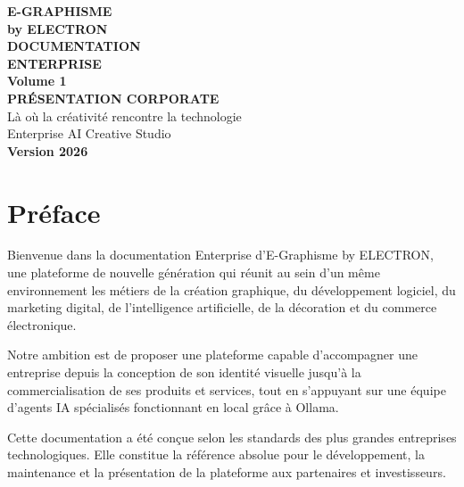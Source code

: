 \documentclass[12pt,a4paper,oneside]{book}
\begin{document}
\begin{titlepage}
\thispagestyle{empty}
\begin{center}
\vspace*{2cm}
{\Huge\bfseries\color{electronblue}E-GRAPHISME}\\[0.3cm]
{\LARGE\bfseries\color{electronpurple}by ELECTRON}\\[2cm]
\vspace{2cm}
{\huge\bfseries\color{darkbg}DOCUMENTATION}\\[0.3cm]
{\huge\bfseries\color{darkbg}ENTERPRISE}\\[1cm]
{\Large\bfseries\color{electroncyan}Volume 1}\\[0.5cm]
{\Large\bfseries\color{darkbg}PRÉSENTATION CORPORATE}\\[3cm]
\vspace{2cm}
{\Large\color{mediumgray}Là où la créativité rencontre la technologie}\\[1cm]
{\Large\color{electronpurple}Enterprise AI Creative Studio}\\[2cm]
{\Large\bfseries\color{electrongold}Version 2026}\\[2cm]
\vfill
\end{center}
\end{titlepage}

\frontmatter

\chapter*{Préface}

Bienvenue dans la documentation Enterprise d'E-Graphisme by ELECTRON, une plateforme de nouvelle génération qui réunit au sein d'un même environnement les métiers de la création graphique, du développement logiciel, du marketing digital, de l'intelligence artificielle, de la décoration et du commerce électronique.

Notre ambition est de proposer une plateforme capable d'accompagner une entreprise depuis la conception de son identité visuelle jusqu'à la commercialisation de ses produits et services, tout en s'appuyant sur une équipe d'agents IA spécialisés fonctionnant en local grâce à Ollama.

Cette documentation a été conçue selon les standards des plus grandes entreprises technologiques. Elle constitue la référence absolue pour le développement, la maintenance et la présentation de la plateforme aux partenaires et investisseurs.
\end{document}
